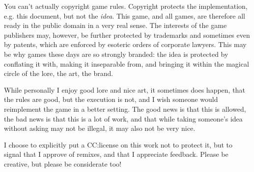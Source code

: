 You can't actually copyright game rules. Copyright protects the implementation,
e.g. this document, but not the \emph{idea}. This game, and all games, are
therefore all ready in the public domain in a very real sense.  The interests
of the game publishers may, however, be further protected by trademarks and
sometimes even by patents, which are enforced by esoteric orders of corporate
lawyers. This may be why games these days are so strongly branded: the idea is
protected by conflating it with, making it inseparable from, and bringing it
within the magical circle of the lore, the art, the brand.

While personally I enjoy good lore and nice art, it sometimes does happen, that
the rules are good, but the execution is not, and I wish someone would
reimplement the game in a better setting. The good news is that this is
allowed, the bad news is that this is a lot of work, and that while taking
someone's idea without asking may not be illegal, it may also not be very nice.

I choose to explicitly put a CC:\CcLongnameBySa license on this work not to
protect it, but to signal that I approve of remixes, and that I appreciate
feedback. Please be creative, but please be considerate too!
